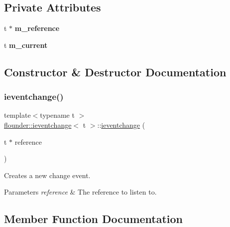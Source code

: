 \subsection*{Private Attributes}
\begin{DoxyCompactItemize}
\item 
\mbox{\label{classflounder_1_1ieventchange_a9eff3c58929bda22207f1643d7cb5d21}} 
t $\ast$ {\bfseries m\+\_\+reference}
\item 
\mbox{\label{classflounder_1_1ieventchange_a2518f1ea95575fa5cd6127e2082ad359}} 
t {\bfseries m\+\_\+current}
\end{DoxyCompactItemize}


\subsection{Constructor \& Destructor Documentation}
\mbox{\label{classflounder_1_1ieventchange_a7cf8556411393fc920080d5b88a8b6d1}} 
\subsubsection{\texorpdfstring{ieventchange()}{ieventchange()}}
{\footnotesize\ttfamily template$<$typename t $>$ \\
\hyperlink{classflounder_1_1ieventchange}{flounder\+::ieventchange}$<$ t $>$\+::\hyperlink{classflounder_1_1ieventchange}{ieventchange} (\begin{DoxyParamCaption}\item[{t $\ast$}]{reference }\end{DoxyParamCaption})\hspace{0.3cm}{\ttfamily [inline]}}



Creates a new change event. 


\begin{DoxyParams}{Parameters}
{\em reference} & The reference to listen to. \\
\hline
\end{DoxyParams}


\subsection{Member Function Documentation}
\mbox{\label{classflounder_1_1ieventchange_a0119e298c97f8457db4024523c97c429}} 
